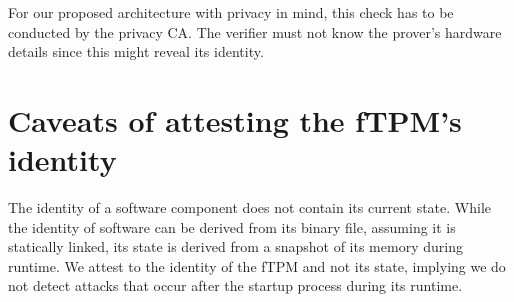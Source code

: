 For our proposed architecture with privacy in mind, this check has to be conducted by the privacy CA\@.
The verifier must not know the prover's hardware details since this might reveal its identity.

\section{Caveats of attesting the fTPM's identity}

The identity of a software component does not contain its current state.
While the identity of software can be derived from its binary file, assuming it is statically linked, its state is derived from a snapshot of its memory during runtime.
We attest to the identity of the fTPM and not its state, implying we do not detect attacks that occur after the startup process during its runtime.
